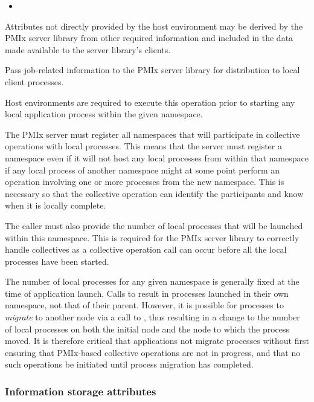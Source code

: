 \begin{itemize}
    \item {}
\end{itemize}

\divider

Attributes not directly provided by the host environment may be derived by the \ac{PMIx} server library from other required information and included in the data made available to the server library's clients.


\descr

Pass job-related information to the \ac{PMIx} server library for distribution to local client processes.

\advicermstart
Host environments are required to execute this operation prior to starting any local application process within the given namespace.

The \ac{PMIx} server must register all namespaces that will participate in collective operations with local processes.
This means that the server must register a namespace even if it will not host any local processes from within that namespace if any local process of another namespace might at some point perform an operation involving one or more processes from the new namespace.
This is necessary so that the collective operation can identify the participants and know when it is locally complete.

The caller must also provide the number of local processes that will be launched within this namespace.
This is required for the \ac{PMIx} server library to correctly handle collectives as a collective operation call can occur before all the local processes have been started.
\advicermend

\adviceuserstart
The number of local processes for any given namespace is generally fixed at the time of application launch. Calls to  result in processes launched in their own namespace, not that of their parent. However, it is possible for processes to \textit{migrate} to another node via a call to , thus resulting in a change to the number of local processes on both the initial node and the node to which the process moved. It is therefore critical that applications not migrate processes without first ensuring that \ac{PMIx}-based collective operations are not in progress, and that no such operations be initiated until process migration has completed.
\adviceuserend

\subsubsection{Information storage attributes}
\label{api:struct:attributes:storage}

